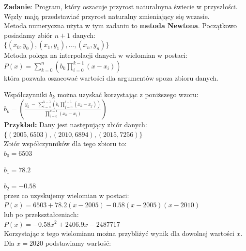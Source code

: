 \documentclass[a4paper,12pt]{article}
\newcommand{\id}{\noindent}
\newcommand{\bl}[1]{\textbf{#1}}
\begin{document}
\textbf{Zadanie}: Program, który oszacuje przyrost naturalnyna świecie w przyszłości. Węzły mają przedstawiać przyrost naturalny zmieniający się wczasie. \\

\id
Metoda numeryczna użyta w tym zadaniu to \textbf{metoda Newtona}. Początkowo posiadamy zbiór $n+1$ danych: \\

$\{ (x_0, y_0), (x_1, y_1), ..., (x_n, y_n) \}$ \\

\id
Metoda polega na interpolacji danych w wielomian w postaci: \\

$P(x) = \sum\limits_{k=0}^{n}\left( b_k\prod\limits_{i=0}^{k-1}(x-x_i) \right )$ \\

\id
która pozwala oszacować wartości dla argumentów spoza zbioru danych. \\

\newpage

\id
Współczynniki $b_k$ można uzyskać korzystając z poniższego wzoru: \\

$b_k = \left( \frac{y_k \ - \ \sum\limits_{i=0}^{k-1}\left( b_i\prod\limits_{j=0}^{i-1}(x_k-x_j) \right)}{\prod\limits_{i = 0}^{k-1}(x_k - x_i)} \right)$ \\

\id
\bl{Przykład:} Dany jest następujący zbiór danych: \\

$\{ (2005, 6503), (2010, 6894), (2015, 7256) \}$ \\

\id
Zbiór współczynników dla tego zbioru to: \\

$b_0 = 6503$

$b_1 = 78.2$

$b_2 = -0.58$ \\

\id
przez co uzyskujemy wielomian w postaci: \\

$P(x) = 6503 + 78.2(x - 2005) - 0.58(x - 2005)(x - 2010)$ \\

\id
lub po przekształceniach: \\

$P(x) = -0.58x^2 + 2406.9 x - 2487717$ \\

\id
Korzystając z tego wielomianu można przybliżyć wynik dla dowolnej wartości $x$. Dla $x = 2020$ podstawiamy wartość: \\
\end{document}
